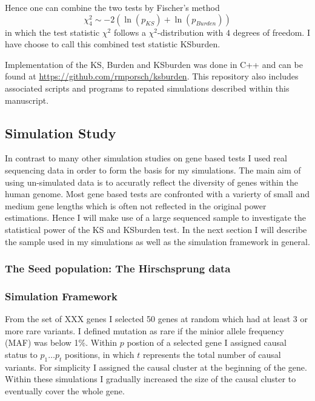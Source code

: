 Hence one can combine the two tests by Fischer's method 
\begin{equation}
	\chi^2_4 \sim - 2 (\ln(p_{KS}) + \ln(p_{Burden}))
\end{equation}
in which the test statistic $\chi^2$ follows a $\chi^2$-distribution with $4$ degrees of freedom.
I have choose to call this combined test statistic KSburden.

Implementation of the KS, Burden and KSburden was done in C++ and can be found at \url{https://github.com/rmporsch/ksburden}.
This repository also includes associated scripts and programs to repated simulations described within this manuscript.

\subsection{Simulation Study}
\label{sub:simulation_study}

In contrast to many other simulation studies on gene based tests I used real sequencing data in order to form the basis for my simulations.
The main aim of using un-simulated data is to accuratly reflect the diversity of genes within the human genome.
Most gene based tests are confronted with a varierty of small and medium gene lengths which is often not reflected in the original power estimations.
Hence I will make use of a large sequenced sample to investigate the statistical power of the KS and KSburden test.
In the next section I will describe the sample used in my simulations as well as the simulation framework in general.

\subsubsection{The Seed population: The Hirschsprung data}
\label{ssub:The_Seed_population:_The_Hirschsprung_data}

\subsubsection{Simulation Framework}
\label{ssub:Simulation_Framework}

From the set of XXX genes I selected 50 genes at random which had at least 3 or more rare variants. 
I defined mutation as rare if the minior allele frequency (MAF) was below 1\%. 
Within $p$ postion of a selected gene I assigned causal status to $p_1 \ldots p_t$ positions, in which $t$ represents the total number of causal variants.
For simplicity I assigned the causal cluster at the beginning of the gene.
Within these simulations I gradually increased the size of the causal cluster to eventually cover the whole gene. 


